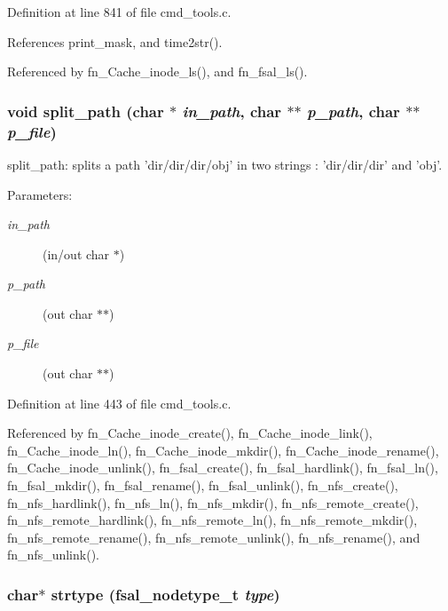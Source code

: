Definition at line 841 of file cmd\_\-tools.c.

References print\_\-mask, and time2str().

Referenced by fn\_\-Cache\_\-inode\_\-ls(), and fn\_\-fsal\_\-ls().
\subsubsection{\setlength{\rightskip}{0pt plus 5cm}void split\_\-path (char $\ast$ {\em in\_\-path}, char $\ast$$\ast$ {\em p\_\-path}, char $\ast$$\ast$ {\em p\_\-file})}\label{cmd__tools_8c_a10}


split\_\-path: splits a path 'dir/dir/dir/obj' in two strings : 'dir/dir/dir' and 'obj'.

\begin{Desc}
\item[Parameters:]
\begin{description}
\item[{\em in\_\-path}](in/out char $\ast$) \item[{\em p\_\-path}](out char $\ast$$\ast$) \item[{\em p\_\-file}](out char $\ast$$\ast$) \end{description}
\end{Desc}


Definition at line 443 of file cmd\_\-tools.c.

Referenced by fn\_\-Cache\_\-inode\_\-create(), fn\_\-Cache\_\-inode\_\-link(), fn\_\-Cache\_\-inode\_\-ln(), fn\_\-Cache\_\-inode\_\-mkdir(), fn\_\-Cache\_\-inode\_\-rename(), fn\_\-Cache\_\-inode\_\-unlink(), fn\_\-fsal\_\-create(), fn\_\-fsal\_\-hardlink(), fn\_\-fsal\_\-ln(), fn\_\-fsal\_\-mkdir(), fn\_\-fsal\_\-rename(), fn\_\-fsal\_\-unlink(), fn\_\-nfs\_\-create(), fn\_\-nfs\_\-hardlink(), fn\_\-nfs\_\-ln(), fn\_\-nfs\_\-mkdir(), fn\_\-nfs\_\-remote\_\-create(), fn\_\-nfs\_\-remote\_\-hardlink(), fn\_\-nfs\_\-remote\_\-ln(), fn\_\-nfs\_\-remote\_\-mkdir(), fn\_\-nfs\_\-remote\_\-rename(), fn\_\-nfs\_\-remote\_\-unlink(), fn\_\-nfs\_\-rename(), and fn\_\-nfs\_\-unlink().
\subsubsection{\setlength{\rightskip}{0pt plus 5cm}char$\ast$ strtype (fsal\_\-nodetype\_\-t {\em type})}\label{cmd__tools_8c_a15}


